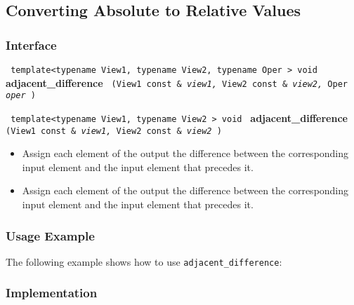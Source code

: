  
\subsection{Converting Absolute to Relative Values} \label{sec-num-adj_diff}

\subsubsection{Interface} %

\noindent
\texttt{%
template<typename View1, typename View2, typename Oper >
\newline
void 
}
\newline
\textbf{adjacent\_difference}%
\texttt{%
(View1 const \&
\textit{view1,}%
View2 const \&
\textit{view2,}%
Oper 
\textit{oper}%
)
}
\vspace{0.4cm}

\noindent
\texttt{%
template<typename View1, typename View2 >
\newline
void 
}
\newline
\textbf{adjacent\_difference}%
\texttt{%
(View1 const \&
\textit{view1,}%
View2 const \&
\textit{view2}%
)
}

\begin{itemize}
\item
Assign each element of the output the difference between the corresponding input element and the input element that precedes it. 
\item
Assign each element of the output the difference between the corresponding input element and the input element that precedes it. 
\end{itemize}

\subsubsection{Usage Example} %

The following example shows how to use \texttt{adjacent\_difference}:

 
\subsubsection{Implementation} %

